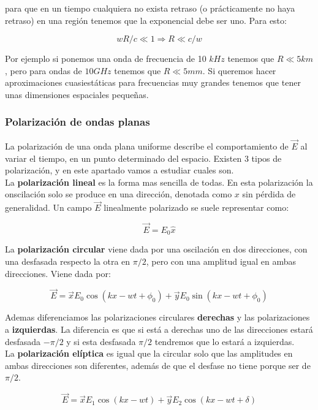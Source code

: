 \documentclass[12pt,a4paper]{article}
\begin{document}
para que en un tiempo cualquiera no exista retraso (o prácticamente no haya retraso) en una región tenemos que la exponencial debe ser uno. Para esto:

$$wR/c \ll 1 \Longrightarrow R \ll c/w $$ 

Por ejemplo si ponemos una onda de frecuencia de 10 $kHz$ tenemos que $R \ll 5 km$, pero para ondas de $10 GHz$ tenemos que $R \ll 5 mm$. Si queremos hacer aproximaciones cuasiestáticas para frecuencias muy grandes tenemos que tener unas dimensiones espaciales pequeñas.

\subsubsection{Polarización de ondas planas}

La polarización de una onda plana uniforme describe el comportamiento de $\vec{E}$ al variar el tiempo, en un punto determinado del espacio. Existen 3 tipos de polarización, y en este apartado vamos a estudiar cuales son. \\

La \textbf{polarización lineal} es la forma mas sencilla de todas. En esta polarización la onscilación solo se produce en una dirección, denotada como $x$ sin pérdida de generalidad. Un campo $\vec{E}$ linealmente polarizado se suele representar como:

$$ \vec{E} = E_0 \widehat{x} $$

La \textbf{polarización circular} viene dada por una oscilación en dos direcciones, con una desfasada respecto la otra en $\pi/2$, pero con una amplitud igual en ambas direcciones. Viene dada por:

$$ \vec{E} = \vec{x} E_0 \cos (kx-wt + \phi_0) + \vec{y} E_0 \sin (kx-wt + \phi_0) $$

Ademas diferenciamos las polarizaciones circulares \textbf{derechas} y las polarizaciones a \textbf{izquierdas}. La diferencia es que si está a derechas uno de las direcciones estará desfasada $-\pi/2$ y si esta desfasada $\pi/2$ tendremos que lo estará a izquierdas.  \\


La \textbf{polarización elíptica} es igual que la circular solo que las amplitudes en ambas direcciones son diferentes, además de que el desfase no tiene porque ser de $\pi/2$. 


$$ \vec{E} = \vec{x} E_1 \cos (kx-wt) + \vec{y} E_2 \cos (kx-wt+\delta) $$
\end{document}

